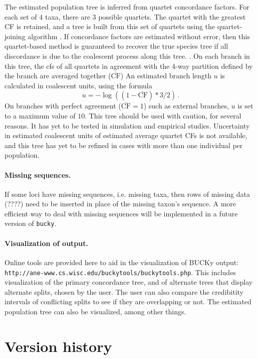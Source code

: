\documentclass[12pt,english,final,letterpaper]{article}
\newcommand{\cf}{concordance factor}
\begin{document}
The estimated population tree is inferred from quartet \cf{}s. 
For each set of 4 taxa, there are 3 possible quartets. The quartet with
the greatest {\sc CF} is retained, and a tree is built from this set of 
quartets using the quartet-joining algorithm \cite{xin_etal-2007}.
If \cf{}s are estimated without error, then this quartet-based method is 
guaranteed to recover the true species tree if all discordance is due to
the coalescent process along this tree. \cite{degnan_etal-2009}. 
On each branch in this tree, the {\sc cf}s of all quartets in agreement 
with the 4-way partition defined by the branch are averaged together
($\bar{\mathrm{CF}}$)
An estimated branch length $u$ is calculated in coalescent units, using the
formula $$u = -\log((1-\bar{\mathrm{CF}})*3/2)\,.$$ 
On branches with perfect agreement ($\bar{\mathrm{CF}}=1$) such as
external branches, $u$ is set to a maximum value of $10$.
This tree should be used with caution, for several reasons. 
It has yet to be tested in simulation and empirical studies.
Uncertainty in estimated coalescent units of estimated average quartet
{\sc CF}s is not available, and this tree has yet to be refined in cases 
with more than one individual per population.

\paragraph{Missing sequences.}
If some loci have missing sequences, i.e. missing taxa, then
rows of missing data (????) need to be inserted in place of the missing 
taxon's sequence. A more efficient way to deal with missing 
sequences will be implemented in a future version of {\tt bucky}.

\paragraph{Visualization of output.}
Online tools are provided here to aid in the visualization of BUCKy output:
\verb+http://ane-www.cs.wisc.edu/buckytools/buckytools.php+.
This includes visualization of the
primary concordance tree, and of alternate trees that display alternate
splits, chosen by the user. The user can also compare the credibitity intervals of 
conflicting splits to see if they are overlapping or not. 
The estimated population tree can also be visualized, among other things.
    
\section{Version history}
\end{document}
